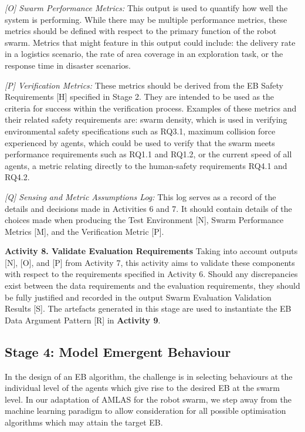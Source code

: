 \documentclass[runningheads]{llncs}
\begin{document}
\emph{[O] Swarm Performance Metrics:} This output is used to quantify how well the system is performing. While there may be multiple performance metrics, these metrics should be defined with respect to the primary function of the robot swarm. Metrics that might feature in this output could include: the delivery rate in a logistics scenario, the rate of area coverage in an exploration task, or the response time in disaster scenarios.

\emph{[P] Verification Metrics:} These metrics should be derived from the EB Safety Requirements [H] specified in Stage 2. They are intended to be used as the criteria for success within the verification process. Examples of these metrics and their related safety requirements are: swarm density, which is used in verifying environmental safety specifications such as RQ3.1, maximum collision force experienced by agents, which could be used to verify that the swarm meets performance requirements such as RQ1.1 and RQ1.2, or the current speed of all agents, a metric relating directly to the human-safety requirements RQ4.1 and RQ4.2. %

\emph{[Q] Sensing and Metric Assumptions Log:} This log serves as a record of the details and decisions made in Activities 6 and 7. It should contain details of the choices made when producing the Test Environment [N], Swarm Performance Metrics [M], and the Verification Metric [P].

\noindent\textbf{Activity 8. Validate Evaluation Requirements} Taking into account outputs [N], [O], and [P] from Activity 7, this activity aims to validate these components with respect to the requirements specified in Activity 6. Should any discrepancies exist between the data requirements and the evaluation requirements, they should be fully justified and recorded in the output Swarm Evaluation Validation Results [S]. 
The artefacts generated in this stage are used to instantiate the EB Data Argument Pattern [R] in \textbf{Activity 9}.

\subsection{Stage 4: Model Emergent Behaviour} \label{framework-stage4}
In the design of an EB algorithm, the challenge is in selecting behaviours at the individual level of the agents which give rise to the desired EB at the swarm level. 
In our adaptation of AMLAS for the robot swarm,  we step away from the machine learning paradigm to allow consideration for all possible optimisation algorithms which may attain the target EB.
\end{document}

